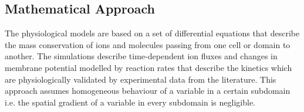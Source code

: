 \subsection{Mathematical Approach}
The physiological models are based on a set of differential equations that describe the mass conservation of ions and molecules passing from one cell or domain to another. The simulations describe time-dependent ion fluxes and changes in membrane potential modelled by reaction rates that describe the kinetics which are physiologically validated by experimental data from the literature. This approach assumes homogeneous behaviour of a variable in a certain subdomain i.e. the spatial gradient of a variable in every subdomain is negligible.



